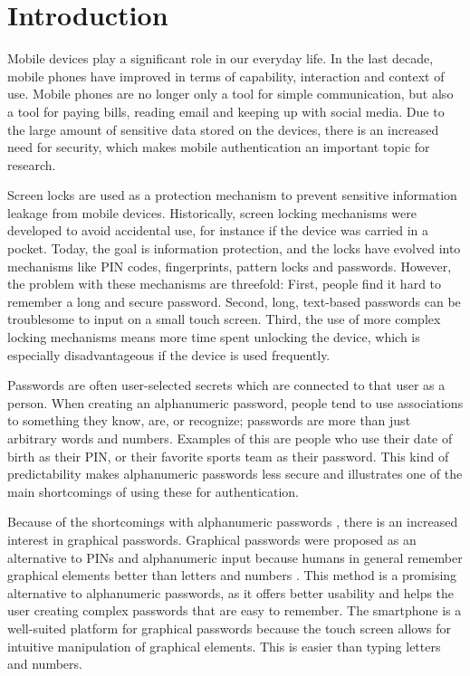 \chapter{Introduction}\label{chap:introduction}
  
    Mobile devices play a significant role in our everyday life. In the last decade, mobile phones have improved in terms of capability, interaction and context of use. Mobile phones are no longer only a tool for simple communication, but also a tool for paying bills, reading email and keeping up with social media. Due to the large amount of sensitive data stored on the devices, there is an increased need for security, which makes mobile authentication an important topic for research.
    
    Screen locks are used as a protection mechanism to prevent sensitive information leakage from mobile devices. Historically, screen locking mechanisms were developed to avoid accidental use, for instance if the device was carried in a pocket. Today, the goal is information protection, and the locks have evolved into mechanisms like PIN codes, fingerprints, pattern locks and passwords. However, the problem with these mechanisms are threefold: First, people find it hard to remember a long and secure password. Second, long, text-based passwords can be troublesome to input on a small touch screen. Third, the use of more complex locking mechanisms means more time spent unlocking the device, which is especially disadvantageous if the device is used frequently.

    Passwords are often user-selected secrets which are connected to that user as a person. When creating an alphanumeric password, people tend to use associations to something they know, are, or recognize; passwords are more than just arbitrary words and numbers. Examples of this are people who use their date of birth as their PIN, or their favorite sports team as their password. This kind of predictability makes alphanumeric passwords less secure and illustrates one of the main shortcomings of using these for authentication.

    Because of the shortcomings with alphanumeric passwords \cite{UnixPasswords}, there is an increased interest in graphical passwords. Graphical passwords were proposed as an alternative to PINs and alphanumeric input because humans in general remember graphical elements better than letters and numbers \cite{DeAngeli}. This method is a promising alternative to alphanumeric passwords, as it offers better usability and helps the user creating complex passwords that are easy to remember. The smartphone is a well-suited platform for graphical passwords because the touch screen allows for intuitive manipulation of graphical elements. This is easier than typing letters and numbers. 
    
